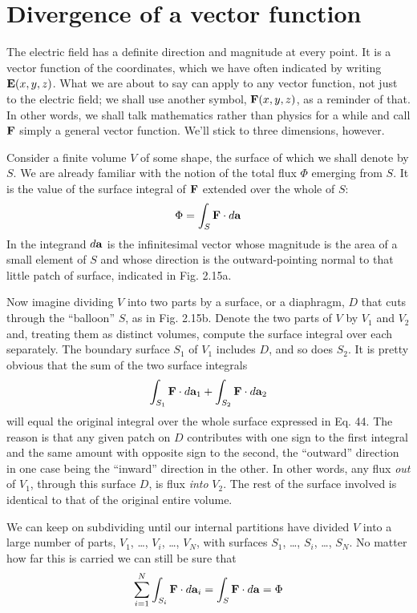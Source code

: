 \section{Divergence of a vector function}

The electric field has a definite direction and magnitude at every
point. It is a vector function of the coordinates, which we have often
indicated by writing $\mathbf{E}(x,y,z)$. What we are about to say can apply
to any vector function, not just to the electric field; we shall use
another symbol, $\mathbf{F}(x,y,z)$, as a reminder of that. In other words, we
shall talk mathematics rather than physics for a while and call $\mathbf{F}$
simply a general vector function. We'll stick to three dimensions,
however.

Consider a finite volume $V$ of some shape, the surface of which we
shall denote by $S$. We are already familiar with the notion of the total
flux $\Phi$ emerging from $S$. It is the value of the surface integral of $\mathbf{F}$
extended over the whole of $S$:
\begin{equation}
  \Phi = \int_S \mathbf{F}\cdot\mathop{d\!}\mathbf{a}
\end{equation}
In the integrand $\mathop{d\!}\mathbf{a}$ is the infinitesimal vector whose magnitude is the
area of a small element of $S$ and whose direction is the outward-pointing
normal to that little patch of surface, indicated in Fig. 2.15a.

Now imagine dividing $V$ into two parts by a surface, or a diaphragm,
$D$ that cuts through the ``balloon'' $S$, as in Fig. 2.15b.
Denote the two parts of $V$ by $V_1$ and $V_2$ and, treating them as distinct
volumes, compute the surface integral over each separately. The
boundary surface $S_1$ of $V_1$ includes $D$, and so does $S_2$. It is pretty
obvious that the sum of the two surface integrals
\begin{equation}
  \int_{S_1} \mathbf{F}\cdot\mathop{d\!} \mathbf{a}_1 + \int_{S_2} \mathbf{F}\cdot\mathop{d\!} \mathbf{a}_2
\end{equation}
will equal the original integral over the whole surface expressed in
Eq. 44. The reason is that any given patch on $D$ contributes with
one sign to the first integral and the same amount with opposite sign
to the second, the ``outward'' direction in one case being the ``inward''
direction in the other. In other words, any flux \emph{out} of $V_1$, through
this surface $D$, is flux \emph{into} $V_2$. The rest of the surface involved is
identical to that of the original entire volume.

We can keep on subdividing until our internal partitions have
divided $V$ into a large number of parts, $V_1$, \ldots, $V_i$, \ldots , $V_N$, with surfaces
$S_1$, \ldots, $S_i$, \ldots , $S_N$. No matter how far this is carried we can
still be sure that
\begin{equation}
  \sum_{i=1}^N \int_{S_i} \mathbf{F}\cdot\mathop{d\!} \mathbf{a}_i = \int_S \mathbf{F}\cdot\mathop{d\!} \mathbf{a} = \Phi
\end{equation}

